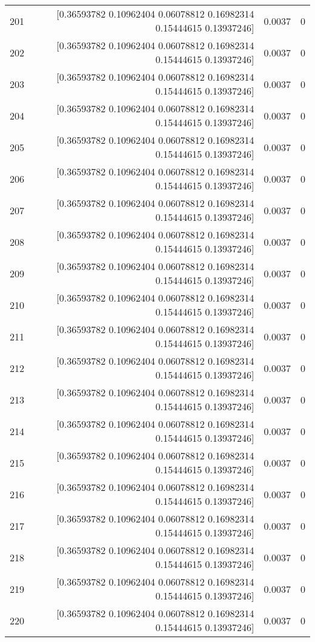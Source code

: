 \begin{longtable}{lrrr}
201 & [0.36593782 0.10962404 0.06078812 0.16982314 0.15444615 0.13937246] & 0.0037 & 0 \\
202 & [0.36593782 0.10962404 0.06078812 0.16982314 0.15444615 0.13937246] & 0.0037 & 0 \\
203 & [0.36593782 0.10962404 0.06078812 0.16982314 0.15444615 0.13937246] & 0.0037 & 0 \\
204 & [0.36593782 0.10962404 0.06078812 0.16982314 0.15444615 0.13937246] & 0.0037 & 0 \\
205 & [0.36593782 0.10962404 0.06078812 0.16982314 0.15444615 0.13937246] & 0.0037 & 0 \\
206 & [0.36593782 0.10962404 0.06078812 0.16982314 0.15444615 0.13937246] & 0.0037 & 0 \\
207 & [0.36593782 0.10962404 0.06078812 0.16982314 0.15444615 0.13937246] & 0.0037 & 0 \\
208 & [0.36593782 0.10962404 0.06078812 0.16982314 0.15444615 0.13937246] & 0.0037 & 0 \\
209 & [0.36593782 0.10962404 0.06078812 0.16982314 0.15444615 0.13937246] & 0.0037 & 0 \\
210 & [0.36593782 0.10962404 0.06078812 0.16982314 0.15444615 0.13937246] & 0.0037 & 0 \\
211 & [0.36593782 0.10962404 0.06078812 0.16982314 0.15444615 0.13937246] & 0.0037 & 0 \\
212 & [0.36593782 0.10962404 0.06078812 0.16982314 0.15444615 0.13937246] & 0.0037 & 0 \\
213 & [0.36593782 0.10962404 0.06078812 0.16982314 0.15444615 0.13937246] & 0.0037 & 0 \\
214 & [0.36593782 0.10962404 0.06078812 0.16982314 0.15444615 0.13937246] & 0.0037 & 0 \\
215 & [0.36593782 0.10962404 0.06078812 0.16982314 0.15444615 0.13937246] & 0.0037 & 0 \\
216 & [0.36593782 0.10962404 0.06078812 0.16982314 0.15444615 0.13937246] & 0.0037 & 0 \\
217 & [0.36593782 0.10962404 0.06078812 0.16982314 0.15444615 0.13937246] & 0.0037 & 0 \\
218 & [0.36593782 0.10962404 0.06078812 0.16982314 0.15444615 0.13937246] & 0.0037 & 0 \\
219 & [0.36593782 0.10962404 0.06078812 0.16982314 0.15444615 0.13937246] & 0.0037 & 0 \\
220 & [0.36593782 0.10962404 0.06078812 0.16982314 0.15444615 0.13937246] & 0.0037 & 0 \\

\end{longtable}

